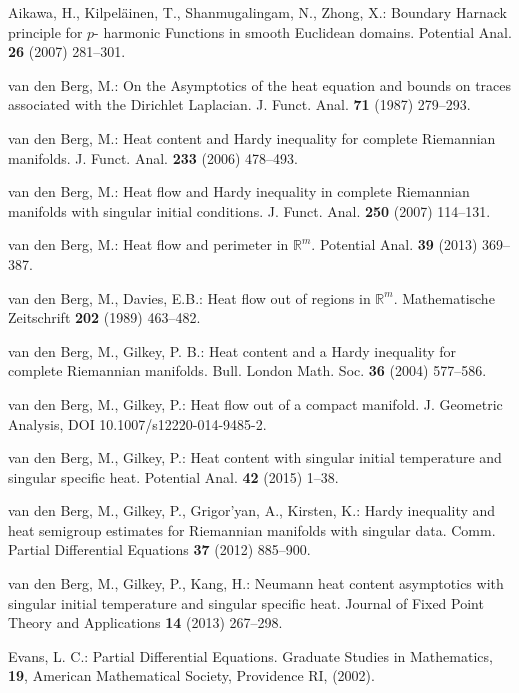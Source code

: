 \documentclass[a4paper,9pt]{amsart}
\begin{document}
\begin{thebibliography}{99}

Aikawa, H., Kilpel\"ainen, T., Shanmugalingam, N., Zhong, X.: Boundary Harnack principle for
$p$- harmonic Functions in smooth Euclidean domains. Potential
Anal. \textbf{26} (2007) 281--301.

van den Berg, M.: On the Asymptotics of the heat equation and
bounds on traces associated with the Dirichlet Laplacian. J.
Funct. Anal. \textbf{71} (1987) 279--293.

van den Berg, M.: Heat content and Hardy inequality for complete Riemannian manifolds.
J. Funct. Anal. \textbf{233} (2006) 478--493.

van den Berg, M.: Heat flow and Hardy inequality in complete Riemannian
 manifolds with singular initial conditions. J. Funct. Anal. \textbf{250} (2007) 114--131.

van den Berg, M.: Heat flow and perimeter in $\mathbb{R}^{m}$.
Potential Anal. \textbf{39} (2013) 369--387.

van den Berg, M., Davies, E.B.: Heat flow out of regions in
$\mathbb{R}^{m}$. Mathematische Zeitschrift \textbf{202} (1989)
463--482.

van den Berg, M., Gilkey, P. B.: Heat content and a Hardy inequality for complete
Riemannian manifolds. Bull. London Math. Soc. \textbf{36} (2004)
577--586.

 van den Berg, M., Gilkey, P.: Heat flow out of a
compact manifold. J. Geometric Analysis, DOI
10.1007/s12220-014-9485-2.

 van den Berg, M., Gilkey, P.: Heat content with singular initial temperature
and singular specific heat. Potential Anal. \textbf{42} (2015)
1--38.

van den Berg, M., Gilkey, P., Grigor'yan, A., Kirsten, K.: Hardy inequality and heat semigroup estimates
 for Riemannian manifolds with singular data. Comm. Partial Differential Equations \textbf{37} (2012) 885--900.

 van den Berg, M., Gilkey, P., Kang, H.: Neumann heat
content asymptotics with singular initial temperature and singular
specific heat. Journal of Fixed Point Theory and Applications
\textbf{14} (2013) 267--298.

 Evans, L. C.: Partial Differential Equations.
Graduate Studies in Mathematics, {\bf 19}, American Mathematical
Society, Providence RI, (2002).


\end{thebibliography}
\end{document}
